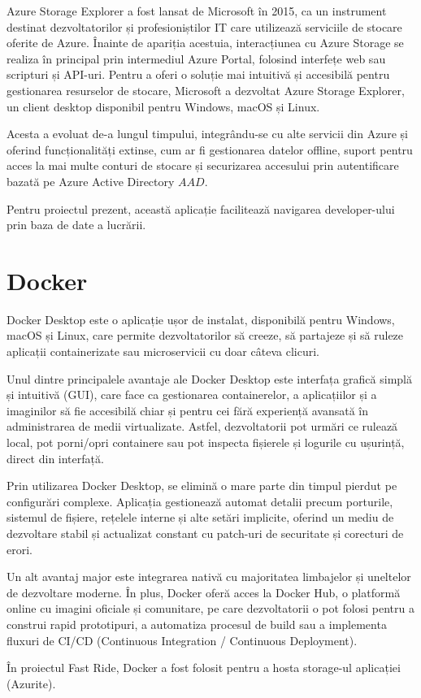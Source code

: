 Azure Storage Explorer a fost lansat de Microsoft în 2015, ca un instrument destinat
dezvoltatorilor și profesioniștilor IT care utilizează serviciile de stocare oferite de Azure. Înainte
de apariția acestuia, interacțiunea cu Azure Storage se realiza în principal prin intermediul Azure
Portal, folosind interfețe web sau scripturi și API-uri. Pentru a oferi o soluție mai intuitivă și
accesibilă pentru gestionarea resurselor de stocare, Microsoft a dezvoltat Azure Storage Explorer,
un client desktop disponibil pentru Windows, macOS și Linux. \parencite{azureStorageExplorer}

Acesta a evoluat de-a lungul timpului, integrându-se cu alte servicii din Azure și oferind
funcționalități extinse, cum ar fi gestionarea datelor offline, suport pentru acces la mai multe
conturi de stocare și securizarea accesului prin autentificare bazată pe Azure Active Directory
\(AAD\). \parencite{azureStorageExplorer}

Pentru proiectul prezent, această aplicație facilitează navigarea developer-ului prin baza de date a lucrării.

\section{Docker}

Docker Desktop este o aplicație ușor de instalat, disponibilă pentru Windows, macOS și Linux, care permite dezvoltatorilor să creeze, să partajeze și să ruleze aplicații containerizate sau microservicii cu doar câteva clicuri. \parencite{docker}

Unul dintre principalele avantaje ale Docker Desktop este interfața grafică simplă și intuitivă (GUI), care face ca gestionarea containerelor, a aplicațiilor și a imaginilor să fie accesibilă chiar și pentru cei fără experiență avansată în administrarea de medii virtualizate. Astfel, dezvoltatorii pot urmări ce rulează local, pot porni/opri containere sau pot inspecta fișierele și logurile cu ușurință, direct din interfață. \parencite{docker}

Prin utilizarea Docker Desktop, se elimină o mare parte din timpul pierdut pe configurări complexe. Aplicația gestionează automat detalii precum porturile, sistemul de fișiere, rețelele interne și alte setări implicite, oferind un mediu de dezvoltare stabil și actualizat constant cu patch-uri de securitate și corecturi de erori. \parencite{docker}

Un alt avantaj major este integrarea nativă cu majoritatea limbajelor și uneltelor de dezvoltare moderne. În plus, Docker oferă acces la Docker Hub, o platformă online cu imagini oficiale și comunitare, pe care dezvoltatorii o pot folosi pentru a construi rapid prototipuri, a automatiza procesul de build sau a implementa fluxuri de CI/CD (Continuous Integration / Continuous Deployment). \parencite{docker}

În proiectul Fast Ride, Docker a fost folosit pentru a hosta storage-ul aplicației (Azurite).
